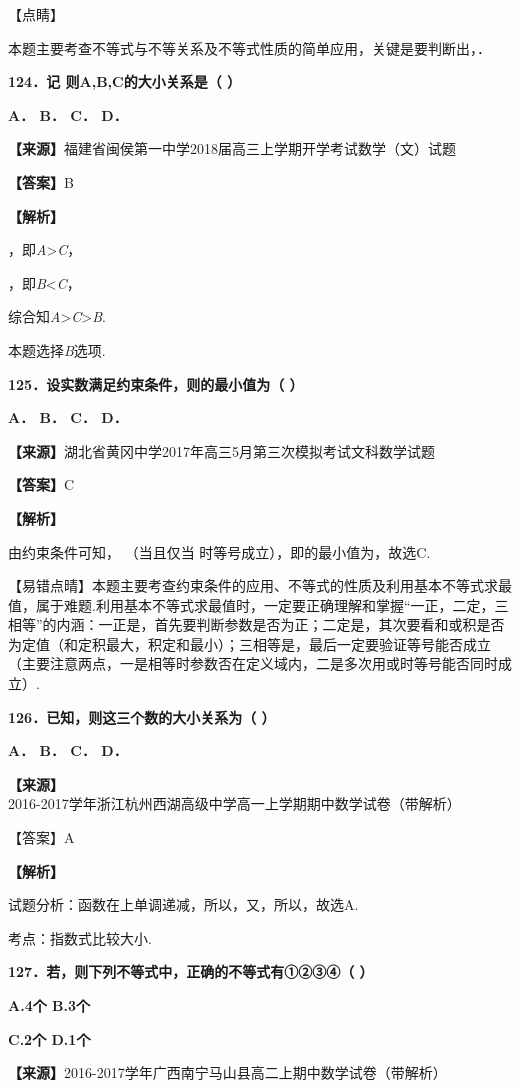 \documentclass[
]{article}
\begin{document}
【点睛】

本题主要考查不等式与不等关系及不等式性质的简单应用，关键是要判断出，．

\textbf{124．记 则A,B,C的大小关系是（ ）}

\textbf{A． B． C． D．}

\textbf{【来源】}福建省闽侯第一中学2018届高三上学期开学考试数学（文）试题

\textbf{【答案】}B

\textbf{【解析】}

，即\emph{A}\textgreater{}\emph{C}，

，即\emph{B}\textless{}\emph{C}，

综合知\emph{A}\textgreater{}\emph{C}\textgreater{}\emph{B}.

本题选择\emph{B}选项.

\textbf{125．设实数满足约束条件，则的最小值为（ ）}

\textbf{A． B． C． D．}

\textbf{【来源】}湖北省黄冈中学2017年高三5月第三次模拟考试文科数学试题

\textbf{【答案】}C

\textbf{【解析】}

由约束条件可知， （当且仅当 时等号成立），即的最小值为，故选C.

【易错点晴】本题主要考查约束条件的应用、不等式的性质及利用基本不等式求最值，属于难题.利用基本不等式求最值时，一定要正确理解和掌握``一正，二定，三相等''的内涵：一正是，首先要判断参数是否为正；二定是，其次要看和或积是否为定值（和定积最大，积定和最小）；三相等是，最后一定要验证等号能否成立（主要注意两点，一是相等时参数否在定义域内，二是多次用或时等号能否同时成立）.

\textbf{126．已知，则这三个数的大小关系为（ ）}

\textbf{A． B． C． D．}

\textbf{【来源】}2016-2017学年浙江杭州西湖高级中学高一上学期期中数学试卷（带解析）

【答案】A

\textbf{【解析】}

试题分析：函数在上单调递减，所以，又，所以，故选A.

考点：指数式比较大小.

\textbf{127．若，则下列不等式中，正确的不等式有①②③④（ ）}

\textbf{A.4个 B.3个}

\textbf{C.2个 D.1个}

\textbf{【来源】}2016-2017学年广西南宁马山县高二上期中数学试卷（带解析）
\end{document}
